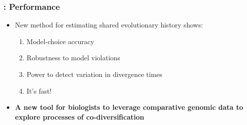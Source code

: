 


\begin{frame}
    \frametitle{\dppmsbayes: Performance}
    \begin{itemize}
        \item<1-> New method for estimating shared evolutionary history shows:
            \begin{enumerate}
                \item<1-> Model-choice accuracy 
                \item<1-> Robustness to model violations
                \item<1-> Power to detect variation in divergence times
                \item<1-> It's fast!
            \end{enumerate}
        \item<2-> \textbf{A new tool for biologists to leverage comparative
                genomic data to explore processes of co-diversification}
    \end{itemize}

\end{frame}
